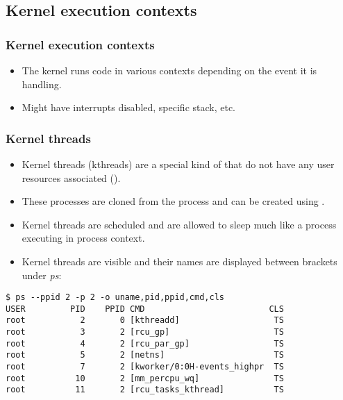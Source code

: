 \subsection{Kernel execution contexts}

\begin{frame}[fragile]
  \frametitle{Kernel execution contexts}
  \begin{itemize}
    \item The kernel runs code in various contexts depending on the event it is
          handling.
    \item Might have interrupts disabled, specific stack, etc.
  \end{itemize}
\end{frame}

\begin{frame}[fragile]
  \frametitle{Kernel threads}
  \begin{itemize}
    \item Kernel threads (kthreads) are a special kind of  that do not
          have any user resources associated ().
    \item These processes are cloned from the  process and can be
          created using .
    \item Kernel threads are scheduled and are allowed to sleep much like a
          process executing in process context.
    \item Kernel threads are visible and their names are displayed between
          brackets under {\em ps}:
  \end{itemize}
  \begin{block}{}
    \begin{verbatim}
$ ps --ppid 2 -p 2 -o uname,pid,ppid,cmd,cls
USER         PID    PPID CMD                         CLS
root           2       0 [kthreadd]                   TS
root           3       2 [rcu_gp]                     TS
root           4       2 [rcu_par_gp]                 TS
root           5       2 [netns]                      TS
root           7       2 [kworker/0:0H-events_highpr  TS
root          10       2 [mm_percpu_wq]               TS
root          11       2 [rcu_tasks_kthread]          TS
    \end{verbatim}
  \end{block}
\end{frame}

